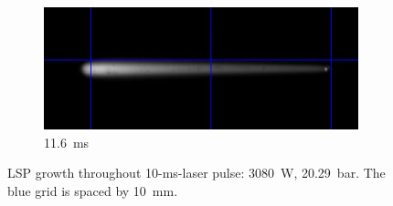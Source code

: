 \begin{figure}[h]
    \hfill
    \begin{subfigure}[t]{0.47\textwidth}
        \centering
        \includegraphics[width=\textwidth]{assets/5 results/1msFrames/116.jpg}
        \caption{\qty{11.6}{ms}}
        \label{fig:growth_frames_116}
    \end{subfigure}
    \caption[LSP growth throughout 10-ms-laser pulse]{LSP growth throughout 10-ms-laser pulse: \qty{3080}{W}, \qty{20.29}{bar}. The blue grid is spaced by \qty{10}{mm}. }
    \label{fig:growth_frames}
\end{figure}